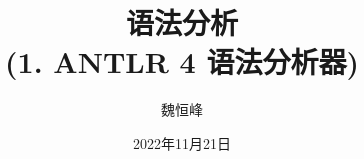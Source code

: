 \documentclass[]{beamer}
\title[语法分析]{语法分析 \\ (1. ANTLR 4 语法分析器)}
\author[魏恒峰]{\large 魏恒峰}
\institute{hfwei@nju.edu.cn}
\date{2022年11月21日}
\begin{document}
\maketitle
% 



\thankyou{}

\end{document}
